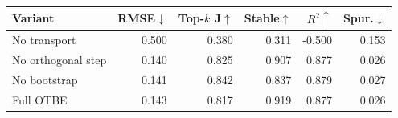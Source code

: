 \begin{tabular}{lrrrrr}
\toprule
Variant & RMSE$\downarrow$ & Top-$k$ J$\uparrow$ & Stable$\uparrow$ & $R^2\uparrow$ & Spur.$\downarrow$\\
\midrule
No transport & 0.500 & 0.380 & 0.311 & -0.500 & 0.153\\
No orthogonal step & 0.140 & 0.825 & 0.907 & 0.877 & 0.026\\
No bootstrap & 0.141 & 0.842 & 0.837 & 0.879 & 0.027\\
Full OTBE & 0.143 & 0.817 & 0.919 & 0.877 & 0.026\\
\bottomrule
\end{tabular}